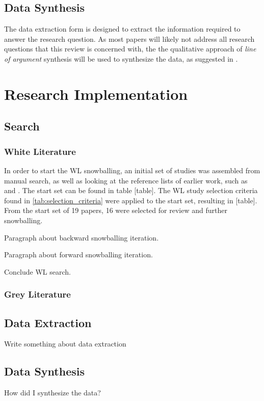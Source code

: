 \subsection{Data Synthesis}
The data extraction form is designed to extract the information required to answer the research question.
As most papers will likely not address all research questions that this review is concerned with, the the qualitative approach of \textit{line of argument} synthesis will be used to synthesize the data, as suggested in \cite{Kitchenham07guidelinesfor}.

\section{Research Implementation}
\label{sec:research_implementation}

\subsection{Search}
\subsubsection{White Literature}
In order to start the WL snowballing, an initial set of studies was assembled from manual search, as well as looking at the reference lists of earlier work, such as \cite{John2021} and \cite{MartinezFernandez2021}.
The start set can be found in table [table].
The WL study selection criteria found in \cref{tab:selection_criteria} were applied to the start set, resulting in [table].
From the start set of 19 papers, 16 were selected for review and further snowballing.

Paragraph about backward snowballing iteration.

Paragraph about forward snowballing iteration.

Conclude WL search.

\subsubsection{Grey Literature}

\subsection{Data Extraction}
Write something about data extraction

\subsection{Data Synthesis}
How did I synthesize the data?
